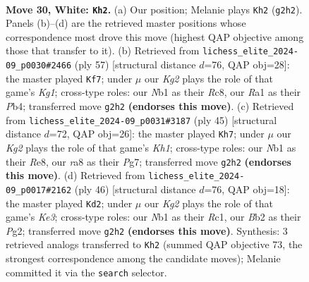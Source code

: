 \documentclass[11pt]{article}
\begin{document}
\clearpage

\begin{figure}[p]\centering
\begin{subfigure}{0.46\textwidth}\centering
\resizebox{\linewidth}{!}{%
\newchessgame
\chessboard[
  setfen={rn1k2r1/1p2bb1p/6pP/p2pPp2/P2N4/6P1/1B4K1/RN3R2 w - - 3 30},
  showmover=false,
  pgfstyle=straightmove, color=movearrow, markmove={g2-h2}
]}
\caption{}
\end{subfigure}\hfill
\begin{subfigure}{0.46\textwidth}\centering
\resizebox{\linewidth}{!}{%
\newchessgame
\chessboard[
  setfen={2r3k1/6p1/1b1p3p/n1rPp3/Pp2B2P/5P2/1PP1K1P1/2RR4 b - - 0 29},
  showmover=false,
  pgfstyle=straightmove, color=movearrow, markmove={g8-f7}
]}
\caption{}
\end{subfigure}
\\[4pt]
\begin{subfigure}{0.46\textwidth}\centering
\resizebox{\linewidth}{!}{%
\newchessgame
\chessboard[
  setfen={r3r2k/2p3p1/7p/1p1bN3/4nP2/P1P1B2P/6PK/R3R3 b - - 2 23},
  showmover=false,
  pgfstyle=straightmove, color=movearrow, markmove={h8-h7}
]}
\caption{}
\end{subfigure}\hfill
\begin{subfigure}{0.46\textwidth}\centering
\resizebox{\linewidth}{!}{%
\newchessgame
\chessboard[
  setfen={2r5/2rbkppp/p3p3/4P3/1PpN1P2/2R1K3/P5PP/2R5 w - - 0 24},
  showmover=false,
  pgfstyle=straightmove, color=movearrow, markmove={e3-d2}
]}
\caption{}
\end{subfigure}
\caption{\textbf{Move 30, White: \texttt{Kh2}.} (a) Our position; Melanie plays \texttt{Kh2} (\texttt{g2h2}). Panels (b)--(d) are the retrieved master positions whose correspondence most drove this move (highest QAP objective among those that transfer to it). (b) Retrieved from \texttt{lichess\_elite\_2024-09\_p0030\#2466} (ply 57) [structural distance $d$=76, QAP obj=28]: the master played \texttt{Kf7}; under $\mu$ our \emph{Kg2} plays the role of that game's \emph{Kg1}; cross-type roles: our \emph{N}b1 as their \emph{R}c8, our \emph{R}a1 as their \emph{P}b4; transferred move \texttt{g2h2} \textbf{(endorses this move)}. (c) Retrieved from \texttt{lichess\_elite\_2024-09\_p0031\#3187} (ply 45) [structural distance $d$=72, QAP obj=26]: the master played \texttt{Kh7}; under $\mu$ our \emph{Kg2} plays the role of that game's \emph{Kh1}; cross-type roles: our \emph{N}b1 as their \emph{R}e8, our \emph{r}a8 as their \emph{P}g7; transferred move \texttt{g2h2} \textbf{(endorses this move)}. (d) Retrieved from \texttt{lichess\_elite\_2024-09\_p0017\#2162} (ply 46) [structural distance $d$=76, QAP obj=18]: the master played \texttt{Kd2}; under $\mu$ our \emph{Kg2} plays the role of that game's \emph{Ke3}; cross-type roles: our \emph{N}b1 as their \emph{R}c1, our \emph{B}b2 as their \emph{P}g2; transferred move \texttt{g2h2} \textbf{(endorses this move)}. Synthesis: 3 retrieved analogs transferred to \texttt{Kh2} (summed QAP objective 73, the strongest correspondence among the candidate moves); Melanie committed it via the \texttt{search} selector.}
\label{fig:thought-m58}
\end{figure}
\end{document}
